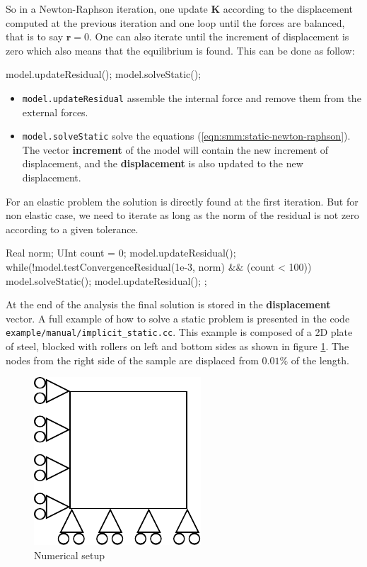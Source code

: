 \documentclass[a4paper,11pt]{book}
\newcommand{\code}[1]{\texttt{#1}}
\renewcommand{\vec}[1]{\ensuremath{\boldsymbol{#1}}}
\newcommand{\mat}[1]{\ensuremath{\boldsymbol{#1}}}
\begin{document}
So  in  a  Newton-Raphson  iteration,  one update  $\mat{K}$  according  to  the
displacement computed  at the previous iteration  and one loop  until the forces
are balanced,  that is to  say $\vec{r}  = 0$.  One  can also iterate  until the
increment  of displacement  is zero  which also  means that  the  equilibrium is
found. This can be done as follow:

\begin{cpp}
  model.updateResidual();
  model.solveStatic();
\end{cpp}
\begin{itemize}
\item \code{model.updateResidual}  assemble the  internal force and  remove them
  from the external forces.
\item         \code{model.solveStatic}        solve         the        equations
  (\ref{eqn:smm:static-newton-raphson}).   The vector \textbf{increment}  of the
  model   will   contain   the   new   increment  of   displacement,   and   the
  \textbf{displacement} is also updated to the new displacement.
\end{itemize}

For  an   elastic  problem  the  solution   is  directly  found   at  the  first
iteration. But for non  elastic case, we need to iterate as  long as the norm of
the residual is not zero according to a given tolerance.
\begin{cpp}
  Real norm;
  UInt count = 0;
  model.updateResidual();
  while(!model.testConvergenceResidual(1e-3, norm) && (count < 100)) {
    model.solveStatic();
    model.updateResidual();
  };
\end{cpp}

At   the  end   of  the   analysis  the   final  solution   is  stored   in  the
\textbf{displacement} vector.  A  full example of how to  solve a static problem
is  presented  in   the  code  \code{example/manual/implicit\_static.cc}.   This
example is  composed of a 2D  plate of steel,  blocked with rollers on  left and
bottom sides as shown in  figure \ref{fig:smm:static}.  The nodes from the right
side of the sample are displaced from $0.01\%$ of the length.

\begin{figure}[!htb]
  \centering
  \includegraphics{figures/implicit_static}
  \caption{Numerical setup\label{fig:smm:static}}
\end{figure}
\end{document}
